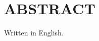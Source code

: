 \chapter*{ABSTRACT}\thispagestyle{headings}
%
\begin{otherlanguage}{english}

Written in English.

\end{otherlanguage}